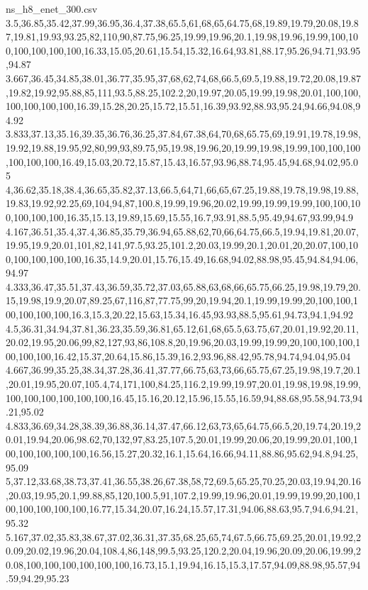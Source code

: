 \begin{filecontents*}[overwrite]{ns_h8_enet_300.csv}
3.5,36.85,35.42,37.99,36.95,36.4,37.38,65.5,61,68,65,64.75,68,19.89,19.79,20.08,19.87,19.81,19.93,93.25,82,110,90,87.75,96.25,19.99,19.96,20.1,19.98,19.96,19.99,100,100,100,100,100,100,16.33,15.05,20.61,15.54,15.32,16.64,93.81,88.17,95.26,94.71,93.95,94.87
3.667,36.45,34.85,38.01,36.77,35.95,37,68,62,74,68,66.5,69.5,19.88,19.72,20.08,19.87,19.82,19.92,95.88,85,111,93.5,88.25,102.2,20,19.97,20.05,19.99,19.98,20.01,100,100,100,100,100,100,16.39,15.28,20.25,15.72,15.51,16.39,93.92,88.93,95.24,94.66,94.08,94.92
3.833,37.13,35.16,39.35,36.76,36.25,37.84,67.38,64,70,68,65.75,69,19.91,19.78,19.98,19.92,19.88,19.95,92,80,99,93,89.75,95,19.98,19.96,20,19.99,19.98,19.99,100,100,100,100,100,100,16.49,15.03,20.72,15.87,15.43,16.57,93.96,88.74,95.45,94.68,94.02,95.05
4,36.62,35.18,38.4,36.65,35.82,37.13,66.5,64,71,66,65,67.25,19.88,19.78,19.98,19.88,19.83,19.92,92.25,69,104,94,87,100.8,19.99,19.96,20.02,19.99,19.99,19.99,100,100,100,100,100,100,16.35,15.13,19.89,15.69,15.55,16.7,93.91,88.5,95.49,94.67,93.99,94.9
4.167,36.51,35.4,37.4,36.85,35.79,36.94,65.88,62,70,66,64.75,66.5,19.94,19.81,20.07,19.95,19.9,20.01,101,82,141,97.5,93.25,101.2,20.03,19.99,20.1,20.01,20,20.07,100,100,100,100,100,100,16.35,14.9,20.01,15.76,15.49,16.68,94.02,88.98,95.45,94.84,94.06,94.97
4.333,36.47,35.51,37.43,36.59,35.72,37.03,65.88,63,68,66,65.75,66.25,19.98,19.79,20.15,19.98,19.9,20.07,89.25,67,116,87,77.75,99,20,19.94,20.1,19.99,19.99,20,100,100,100,100,100,100,16.3,15.3,20.22,15.63,15.34,16.45,93.93,88.5,95.61,94.73,94.1,94.92
4.5,36.31,34.94,37.81,36.23,35.59,36.81,65.12,61,68,65.5,63.75,67,20.01,19.92,20.11,20.02,19.95,20.06,99,82,127,93,86,108.8,20,19.96,20.03,19.99,19.99,20,100,100,100,100,100,100,16.42,15.37,20.64,15.86,15.39,16.2,93.96,88.42,95.78,94.74,94.04,95.04
4.667,36.99,35.25,38.34,37.28,36.41,37.77,66.75,63,73,66,65.75,67.25,19.98,19.7,20.1,20.01,19.95,20.07,105.4,74,171,100,84.25,116.2,19.99,19.97,20.01,19.98,19.98,19.99,100,100,100,100,100,100,16.45,15.16,20.12,15.96,15.55,16.59,94,88.68,95.58,94.73,94.21,95.02
4.833,36.69,34.28,38.39,36.88,36.14,37.47,66.12,63,73,65,64.75,66.5,20,19.74,20.19,20.01,19.94,20.06,98.62,70,132,97,83.25,107.5,20.01,19.99,20.06,20,19.99,20.01,100,100,100,100,100,100,16.56,15.27,20.32,16.1,15.64,16.66,94.11,88.86,95.62,94.8,94.25,95.09
5,37.12,33.68,38.73,37.41,36.55,38.26,67.38,58,72,69.5,65.25,70.25,20.03,19.94,20.16,20.03,19.95,20.1,99.88,85,120,100.5,91,107.2,19.99,19.96,20.01,19.99,19.99,20,100,100,100,100,100,100,16.77,15.34,20.07,16.24,15.57,17.31,94.06,88.63,95.7,94.6,94.21,95.32
5.167,37.02,35.83,38.67,37.02,36.31,37.35,68.25,65,74,67.5,66.75,69.25,20.01,19.92,20.09,20.02,19.96,20.04,108.4,86,148,99.5,93.25,120.2,20.04,19.96,20.09,20.06,19.99,20.08,100,100,100,100,100,100,16.73,15.1,19.94,16.15,15.3,17.57,94.09,88.98,95.57,94.59,94.29,95.23

\end{filecontents*}

